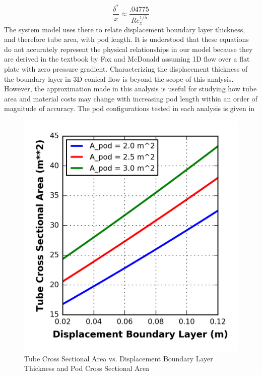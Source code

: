 \begin{equation}
	\label{eq:boundary_layer}
	\frac{\delta^{*}}{x} \approx  \frac{.04775}{Re_{x}^{1/5}}
\end{equation}
The system model uses there to relate displacement boundary layer thickness, and therefore tube area, with pod length. It is understood that these equations do not accurately represent the physical relationships in our model because they are derived in the textbook by Fox and McDonald assuming 1D flow over a flat plate with zero pressure gradient. Characterizing the displacement thickness of the boundary layer in 3D conical flow is beyond the scope of this analysis. However, the approximation made in this analysis is useful for studying how tube area and material costs may change with increasing pod length within an order of magnitude of accuracy.  The pod configurations tested in each analysis is given in
\begin{table}
	\centering
	\caption{Configurations in boundary layer sensitivity study}
	\label{tbl:boundary_layer_sensitivty_configs}
\end{table}
\begin{figure}
	\centering
	\caption{Tube Cross Sectional Area vs. Displacement Boundary Layer Thickness and Pod Cross Sectional Area}
	\label{fig:cross_sec_area_vs_disp_boundary_layer}
	\includegraphics{../../images/graphs/boundary_layer_growth_trades/Tube_Area_vs_boundary_layer.png}
\end{figure}
